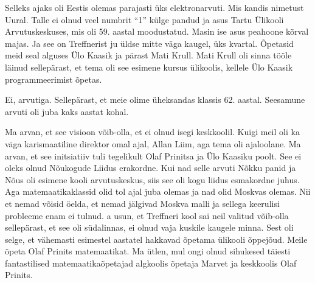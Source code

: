 
Selleks ajaks oli Eestis olemas parajasti üks elektronarvuti. Mis kandis 
nimetust Uural. Talle ei olnud veel numbrit \enquote{1} külge 
pandud ja asus Tartu Ülikooli Arvutuskeskuses, mis oli 59. aastal moodustatud. Masin ise asus peahoone 
kõrval majas. Ja see on Treffnerist ju üldse mitte väga kaugel, üks kvartal. 
Õpetasid meid seal alguses Ülo Kaasik ja pärast Mati 
Krull. Mati Krull oli sinna tööle läinud sellepärast, 
et tema oli see esimene kursus ülikoolis, kellele Ülo Kaasik programmeerimist õpetas. 


Ei, arvutiga. Sellepärast, et meie olime üheksandas klassis 62. aastal. 
Seesamune arvuti oli juba kaks aastat kohal. 


Ma arvan, et see visioon võib-olla, et ei olnud isegi keskkoolil. Kuigi meil 
oli ka väga karismaatiline direktor omal ajal, Allan Liim, aga tema oli ajaloolane. Ma arvan, et see initsiatiiv tuli tegelikult 
Olaf Prinitsa ja Ülo Kaasiku 
poolt. See ei oleks olnud Nõukogude Liidus erakordne. Kui nad selle arvuti 
Nõkku panid ja Nõus oli esimene kooli arvutuskeskus, siis 
see oli kogu liidus esmakordne juhus. Aga matemaatikaklassid olid tol ajal juba 
olemas ja nad olid Moskvas olemas. Nii et nemad võisid öelda, et nemad jälgivad 
Moskva malli ja sellega keerulisi probleeme enam ei tulnud. a usun, et 
Treffneri kool sai neil valitud võib-olla sellepärast, et see oli südalinnas, 
ei olnud vaja kuskile kaugele minna. Sest oli selge, et vähemasti esimestel 
aastatel hakkavad õpetama ülikooli õppejõud. Meile õpeta Olaf Prinits 
matemaatikat. Ma ütlen, mul ongi olnud sihukesed täiesti fantastilised 
matemaatikaõpetajad algkoolis õpetaja Marvet ja keskkoolis Olaf 
Prinits. 


